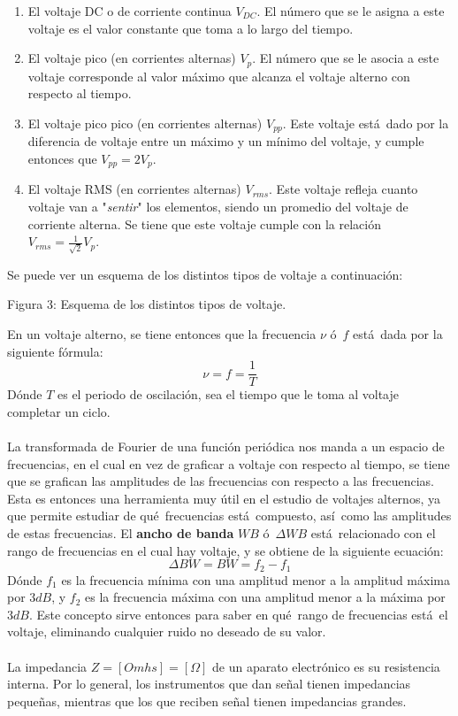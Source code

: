 \documentclass{article}
\begin{document}
\begin{enumerate}
\item El voltaje DC o de corriente continua $V_{DC}$. El n\'umero que se le asigna a este voltaje es el valor constante que toma a lo largo del tiempo.
\item El voltaje pico (en corrientes alternas) $V_p$. El n\'umero que se le asocia a este voltaje corresponde al valor m\'aximo que alcanza el voltaje alterno con respecto al tiempo.
\item El voltaje pico pico (en corrientes alternas) $V_{pp}$. Este voltaje est\'a\ dado por la diferencia de voltaje entre un m\'aximo y un m\'inimo del voltaje, y cumple entonces que $V_{pp}=2V_p$.
\item El voltaje RMS (en corrientes alternas) $V_{rms}$. Este voltaje refleja cuanto voltaje van a "\textit{sentir}" los elementos, siendo un promedio del voltaje de corriente alterna. Se tiene que este voltaje cumple con la relaci\'on $V_{rms}=\frac{1}{\sqrt{2}}V_p$.
\end{enumerate}
Se puede ver un esquema de los distintos tipos de voltaje a continuaci\'on:
\vspace{5cm}
\begin{center}
Figura 3: Esquema de los distintos tipos de voltaje.
\end{center}
En un voltaje alterno, se tiene entonces que la frecuencia $\nu$ \'o\ $f$ est\'a\ dada por la siguiente f\'ormula:
\begin{equation}
\nu=f=\frac{1}{T}
\end{equation}
D\'onde $T$ es el periodo de oscilaci\'on, sea el tiempo que le toma al voltaje completar un ciclo. \\ \\
La transformada de Fourier de una funci\'on peri\'odica nos manda a un espacio de frecuencias, en el cual en vez de graficar a voltaje con respecto al tiempo, se tiene que se grafican las amplitudes de las frecuencias con respecto a las frecuencias. Esta es entonces una herramienta muy \'util en el estudio de voltajes alternos, ya que permite estudiar de qu\'e\ frecuencias est\'a\ compuesto, as\'i\ como las amplitudes de estas frecuencias. El \textbf{ancho de banda} $WB$ \'o\ $\Delta WB$ est\'a\ relacionado con el rango de frecuencias en el cual hay voltaje, y se obtiene de la siguiente ecuaci\'on:
\begin{equation}
\Delta BW=BW=f_2-f_1
\end{equation}
D\'onde $f_1$ es la frecuencia m\'inima con una amplitud menor a la amplitud m\'axima por $3dB$, y $f_2$ es la frecuencia m\'axima con una amplitud menor a la m\'axima por $3dB$. Este concepto sirve entonces para saber en qu\'e\ rango de frecuencias est\'a\ el voltaje, eliminando cualquier ruido no deseado de su valor. \\ \\
La impedancia $Z=[Omhs]=[\Omega]$ de un aparato electr\'onico es su resistencia interna. Por lo general, los instrumentos que dan se\~nal tienen impedancias peque\~nas, mientras que los que reciben se\~nal tienen impedancias grandes. 
\end{document}

